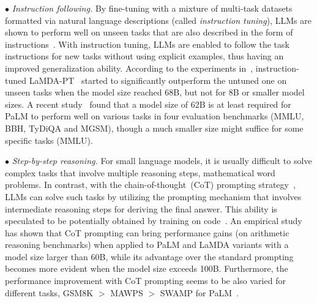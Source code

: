 $\bullet$ \emph{Instruction following.} 
By fine-tuning with a mixture of multi-task  datasets formatted via natural language descriptions (called  \emph{instruction tuning}),  
LLMs are shown to  perform well on unseen tasks that are also described in the form of  instructions~\cite{Ouyang-arxiv-2022-Training,Wei-ICLR-2022-Finetuned,Sanh-ICLR-2022-Multitask}. 
{With instruction tuning,  LLMs are enabled to follow  
the task instructions for new tasks without using explicit examples, thus having an improved generalization ability.} 
According to the experiments in~\cite{Wei-ICLR-2022-Finetuned}, instruction-tuned LaMDA-PT~\cite{Thoppilan-CoRR-2022-LaMDA} started to significantly outperform the untuned one on unseen tasks when the model size reached 68B, but not for 8B or smaller model sizes. A recent study~\cite{Chung-arxiv-2022-Scaling} found that a model size of 62B is at least required for PaLM to perform  well on various tasks in four evaluation benchmarks (\ie MMLU, BBH, TyDiQA and MGSM), though a much smaller size might suffice for some specific tasks (\eg MMLU). 






$\bullet$ \emph{Step-by-step reasoning.} 
For small language models, it is usually difficult to solve complex tasks that involve multiple reasoning steps, \eg mathematical word problems.
{In contrast, with the chain-of-thought~(CoT) prompting strategy~\cite{Wei-arxiv-2022-chain}, LLMs can solve such tasks by utilizing the prompting mechanism that involves intermediate reasoning steps for deriving the final answer.} 
This ability is speculated to be potentially obtained by training on code~\cite{FU-blog-2022-how,Wei-arxiv-2022-chain}. 
An empirical study~\cite{Wei-arxiv-2022-chain} has shown that CoT prompting can bring performance gains (on arithmetic reasoning benchmarks) when applied to PaLM and LaMDA variants with a model size larger than 60B, while its advantage over the standard prompting becomes more evident when the model size exceeds 100B.  
Furthermore, the performance improvement with CoT prompting seems to be also varied for different tasks, \eg GSM8K $>$ MAWPS $>$ SWAMP for PaLM~\cite{Wei-arxiv-2022-chain}. 

